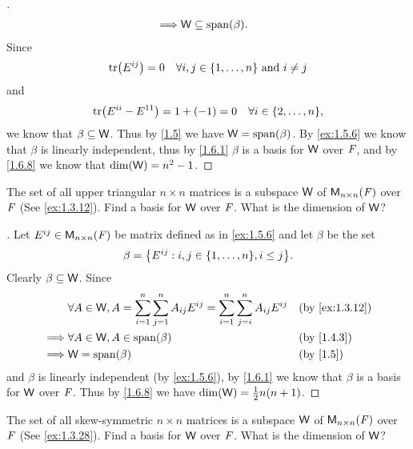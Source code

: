 \begin{proof}[]
\begin{align*}
		\implies & \W \subseteq \spn{\beta}.
	\end{align*}
	Since
	\[
		\tr[E^{i j}] = 0 \quad \forall i, j \in \set{1, \dots, n} \text{ and } i \neq j
	\]
	and
	\[
		\tr[E^{i i} - E^{1 1}] = 1 + (-1) = 0 \quad \forall i \in \set{2, \dots, n},
	\]
	we know that \(\beta \subseteq \mathsf{W}\).
	Thus by \cref{1.5} we have \(\W = \spn{\beta}\).
	By \cref{ex:1.5.6} we know that \(\beta\) is linearly independent, thus by \cref{1.6.1} \(\beta\) is a basis for \(\mathsf{W}\) over \(\mathit{F}\), and by \cref{1.6.8} we know that \(\dim(\mathsf{W}) = n^2 - 1\).
\end{proof}

\begin{ex}\label{ex:1.6.16}
	The set of all upper triangular \(n \times n\) matrices is a subspace \(\mathsf{W}\) of \(\ms[n][n][\F]\) over \(\mathit{F}\) (See \cref{ex:1.3.12}).
	Find a basis for \(\mathsf{W}\) over \(\mathit{F}\).
	What is the dimension of \(\mathsf{W}\)?
\end{ex}

\begin{proof}[]
	Let \(E^{i j} \in \ms[n][n][\F]\) be matrix defined as in \cref{ex:1.5.6} and let \(\beta\) be the set
	\[
		\beta = \set{E^{i j} : i, j \in \set{1, \dots, n}, i \leq j}.
	\]
	Clearly \(\beta \subseteq \mathsf{W}\).
	Since
	\begin{align*}
		         & \forall A \in \W, A = \sum_{i = 1}^n \sum_{j = 1}^n A_{i j} E^{i j} = \sum_{i = 1}^n \sum_{j = i}^n A_{i j} E^{i j} &  & \by{ex:1.3.12} \\
		\implies & \forall A \in \W, A \in \spn{\beta}                                                                                 &  & \by{1.4.3}     \\
		\implies & \W = \spn{\beta}                                                                                                    &  & \by{1.5}
	\end{align*}
	and \(\beta\) is linearly independent (by \cref{ex:1.5.6}), by \cref{1.6.1} we know that \(\beta\) is a basis for \(\mathsf{W}\) over \(\mathit{F}\).
	Thus by \cref{1.6.8} we have \(\dim(\mathsf{W}) = \frac{1}{2} n(n + 1)\).
\end{proof}

\begin{ex}\label{ex:1.6.17}
	The set of all skew-symmetric \(n \times n\) matrices is a subspace \(\mathsf{W}\) of \(\ms[n][n][\F]\) over \(\mathit{F}\) (See \cref{ex:1.3.28}).
	Find a basis for \(\mathsf{W}\) over \(\mathit{F}\).
	What is the dimension of \(\mathsf{W}\)?
\end{ex}


